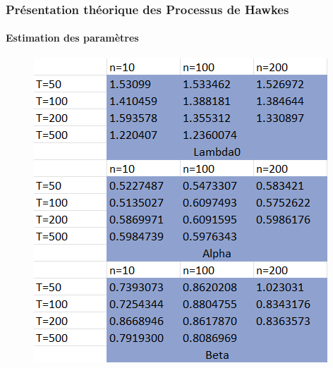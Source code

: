 \begin{frame}
    \frametitle{Présentation théorique des Processus de Hawkes}
    \framesubtitle{Estimation des paramètres}
        \begin{figure}[h]
            \centering
            \includegraphics[width=0.5\linewidth]{figures/estim.png}
        \end{figure}
\end{frame}






